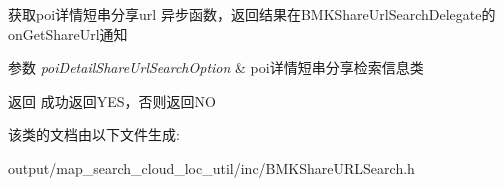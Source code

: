获取poi详情短串分享url 异步函数，返回结果在\+B\+M\+K\+Share\+Url\+Search\+Delegate的on\+Get\+Share\+Url通知 
\begin{DoxyParams}{参数}
{\em poi\+Detail\+Share\+Url\+Search\+Option} & poi详情短串分享检索信息类 \\
\hline
\end{DoxyParams}
\begin{DoxyReturn}{返回}
成功返回\+Y\+E\+S，否则返回\+N\+O 
\end{DoxyReturn}


该类的文档由以下文件生成\+:\begin{DoxyCompactItemize}
\item 
output/map\+\_\+search\+\_\+cloud\+\_\+loc\+\_\+util/inc/B\+M\+K\+Share\+U\+R\+L\+Search.\+h\end{DoxyCompactItemize}
